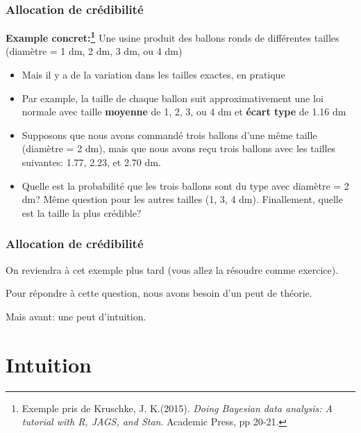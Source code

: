\documentclass{beamer}
\begin{document}
\begin{frame}
    \frametitle{Allocation de crédibilité}
    \textbf{Example concret:\footnote{
      Exemple pris de Kruschke, J. K.(2015). \emph{Doing Bayesian data analysis: A tutorial with R, JAGS, and Stan}.
            Academic Press, pp 20-21.
    }}
    Une usine produit des ballons ronds de différentes tailles (diamètre = 1 dm, 2 dm, 3 dm, ou 4 dm) \pause
    \begin{itemize}
      \item Mais il y a de la variation dans les tailles exactes, en pratique
      \pause
      \item Par example, la taille de chaque ballon suit approximativement une loi normale avec
            taille \textbf{moyenne} de 1, 2, 3, ou 4 dm et \textbf{écart type} de 1.16 dm
      \pause
      \item Supposons que nous avons commandé trois ballons d'une même taille (diamètre = 2 dm),
            mais que nous avons reçu trois ballons avec les tailles suivantes: 1.77, 2.23, et 2.70 dm.
      \pause
      \item Quelle est la probabilité que les trois ballons sont du type avec diamètre = 2 dm?
            Même question pour les autres tailles (1, 3, 4 dm). Finallement, quelle est la
            taille la plus crédible?
    \end{itemize}
\end{frame}


\begin{frame}
    \frametitle{Allocation de crédibilité}
    On reviendra à cet exemple plus tard (vous allez la résoudre comme exercice).

    \pause

    \vfill

    Pour répondre à cette question, nous avons besoin d'un peut de théorie.

    \pause

    \vfill

    Mais avant: une peut d'intuition.
\end{frame}



\section{Intuition}
\end{document}
